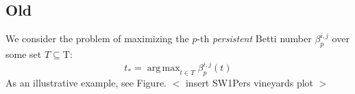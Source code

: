 \documentclass[10pt]{article}
\DeclareMathOperator*{\argmax}{arg\,max}
\begin{document}
\subsection{Old}

We consider the problem of maximizing the $p$-th \emph{persistent} Betti number $\beta^{i,j}_p$ over some set $T \subseteq \mathrm{T}$: 
\begin{equation}
	t_\ast = \argmax_{t \in T}	 \beta_{p}^{i,j}(t)
\end{equation}
As an illustrative example, see Figure. 
$<$ insert SW1Pers vineyards plot $>$






\end{document}
